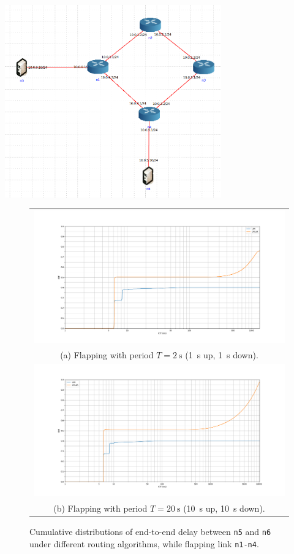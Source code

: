 \documentclass[10pt,twoside,a4paper]{article}
\begin{document}
\begin{minipage}{1\textwidth} \centering
	\includegraphics[width=0.7\textwidth]{box}
\end{minipage}

\begin{figure}
\begin{tabular}{c}
  \includegraphics[width=190mm]{fig_box_flap1} \\
  (a) Flapping with period $T=\SI{2}{\s}$ (\SI{1}{\s} up, \SI{1}{\s} down). \\ [6pt]
  \includegraphics[width=190mm]{fig_box_flap10} \\
  (b) Flapping with period $T=\SI{20}{\s}$ (\SI{10}{\s} up, \SI{10}{\s} down). \\[6pt]
\end{tabular}
\caption{Cumulative distributions of end-to-end delay between \texttt{n5} and \texttt{n6} under different routing algorithms, while flapping link \texttt{n1-n4}.}
\end{figure}
\end{document}
